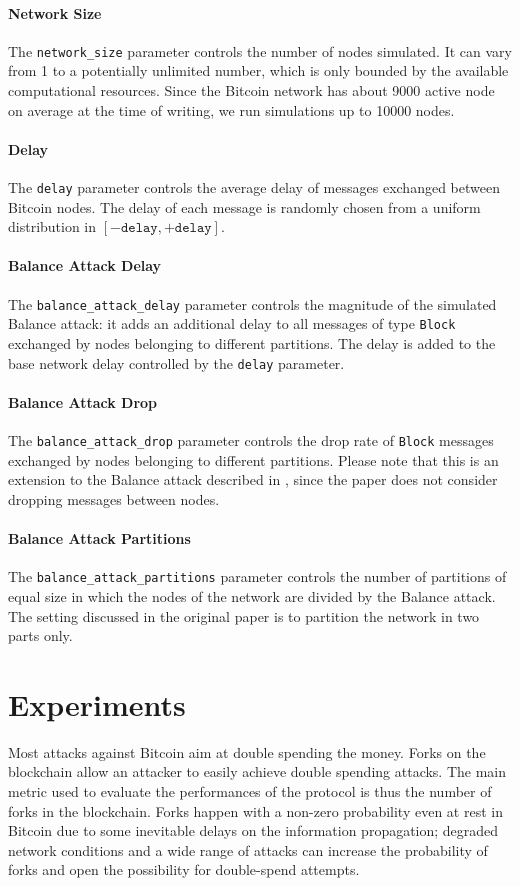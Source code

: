 \paragraph{Network Size}
The \texttt{network\_size} parameter controls the number of nodes simulated.
It can vary from \num{1} to a potentially unlimited number, which is only bounded by the available computational resources.
Since the Bitcoin network has about \num{9000} active node on average at the time of writing, we run simulations up to \num{10000} nodes.

\paragraph{Delay}
The \texttt{delay} parameter controls the average delay of messages exchanged between Bitcoin nodes.
The delay of each message is randomly chosen from a uniform distribution in $[-\texttt{delay}, +\texttt{delay}]$.

\paragraph{Balance Attack Delay}
The \texttt{balance\_attack\_delay} parameter controls the magnitude of the simulated Balance attack:
it adds an additional delay to all messages of type \texttt{Block} exchanged by nodes belonging to different partitions.
The delay is added to the base network delay controlled by the \texttt{delay} parameter.

\paragraph{Balance Attack Drop}
The \texttt{balance\_attack\_drop} parameter controls the drop rate of \texttt{Block} messages exchanged by nodes belonging to different partitions.
Please note that this is an extension to the Balance attack described in \cite{balance_attack_2017}, since the paper does not consider dropping messages between nodes.

\paragraph{Balance Attack Partitions}
The \texttt{balance\_attack\_partitions} parameter controls the number of partitions of equal size in which the nodes of the network are divided by the Balance attack.
The setting discussed in the original paper is to partition the network in two parts only.


\section{Experiments}
Most attacks against Bitcoin aim at double spending the money.
Forks on the blockchain allow an attacker to easily achieve double spending attacks.
The main metric used to evaluate the performances of the protocol is thus the number of forks in the blockchain.
Forks happen with a non-zero probability even at rest in Bitcoin due to some inevitable delays on the information propagation;
degraded network conditions and a wide range of attacks can increase the probability of forks and open the possibility for double-spend attempts.

